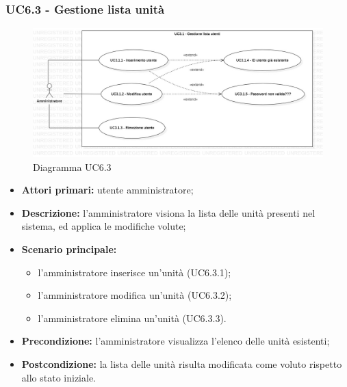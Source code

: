 \subsubsection{UC6.3 - Gestione lista unità}
	\begin{center}
		\begin{figure}[h!]
			\includegraphics[width=15cm]{images/uc3.1.jpg}
			\caption{Diagramma UC6.3}
		\end{figure}
	\end{center}
	\begin{itemize}
		\item \textbf{Attori primari:} utente amministratore;
		\item \textbf{Descrizione:} l'amministratore visiona la lista delle unità presenti nel sistema, ed applica le modifiche volute;
		\item \textbf{Scenario principale:} 
			\begin{itemize}
				\item l'amministratore inserisce un'unità (UC6.3.1);
				\item l'amministratore modifica un'unità (UC6.3.2);
				\item l'amministratore elimina un'unità (UC6.3.3).
			\end{itemize}
		\item \textbf{Precondizione:} l'amministratore visualizza l'elenco delle unità esistenti;
		\item \textbf{Postcondizione:} la lista delle unità risulta modificata come voluto rispetto allo stato iniziale.
	\end{itemize}

